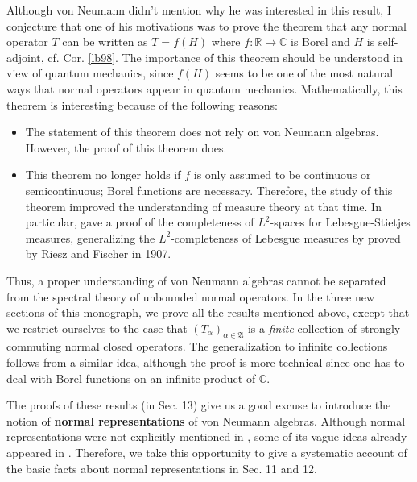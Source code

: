 \documentclass[12pt,b5paper,notitlepage]{article}
\theoremstyle{definition}
\theoremstyle{plain}
\newcommand{\fk}{\mathfrak}
\newcommand{\Cbb}{\mathbb C}
\newcommand{\Rbb}{\mathbb R}
\numberwithin{equation}{section}
\begin{document}
Although von Neumann didn't mention why he was interested in this result, I conjecture that one of his motivations was to prove the theorem that any normal operator $T$ can be written as $T=f(H)$ where $f:\Rbb\rightarrow\Cbb$ is Borel and $H$ is self-adjoint, cf. Cor. \ref{lb98}. The importance of this theorem should be understood in view of quantum mechanics, since $f(H)$ seems to be one of the most natural ways that normal operators appear in quantum mechanics. Mathematically, this theorem is interesting because of the following reasons:
\begin{itemize}
\item The statement of this theorem does not rely on von Neumann algebras. However, the proof of this theorem does.
\item This theorem no longer holds if $f$ is only assumed to be  continuous or semicontinuous; Borel functions are necessary. Therefore, the study of this theorem improved the understanding of measure theory at that time. In particular, \cite{vNeu31} gave a proof of the completeness of $L^2$-spaces for Lebesgue-Stietjes measures, generalizing the $L^2$-completeness of Lebesgue measures by proved by Riesz and Fischer in 1907.
\end{itemize}



Thus, a proper understanding of von Neumann algebras cannot be separated from the spectral theory of unbounded normal operators. In the three new sections of this monograph, we prove all the results mentioned above, except that we restrict ourselves to the case that $(T_\alpha)_{\alpha\in\fk A}$ is a \textit{finite} collection of strongly commuting normal closed operators. The generalization to infinite collections follows from a similar idea, although the proof is more technical since one has to deal with Borel functions on an infinite product of $\Cbb$.



The proofs of these results (in Sec. 13) give us a good excuse to introduce the notion of \textbf{normal representations} of von Neumann algebras. Although normal representations were not explicitly mentioned in \cite{vNeu29,vNeu31}, some of its vague ideas already appeared in \cite{vNeu31}. Therefore, we take this opportunity to give a systematic account of the basic facts about normal representations in Sec. 11 and 12.
\end{document}

